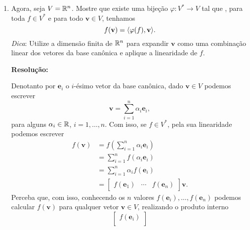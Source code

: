 \documentclass[leqno]{article}
\numberwithin{equation}{section}
\newcommand{\bfv}{\mathbf{v}}
\newcommand{\bfe}{\mathbf{e}}
\newenvironment{sol}
{
    \vspace{4mm}
    \noindent\textbf{Resolução:}
    \strut\newline
    \smallskip
    \hspace{-3.5mm}
}
{}
\begin{document}
\begin{enumerate}
\begin{enumerate}
            \item Agora, seja \( V = \mathbb{R}^{ n } \).
                Mostre que existe uma bijeção \( \varphi : V^{ * } \to V \) tal que , para toda \( f \in V^{ * } \) e para todo \( \bfv \in V \), tenhamos
                \begin{equation*}
                    f(\bfv) = \dotprod{\varphi(f), \bfv}
                .\end{equation*}
                \textit{Dica}: Utilize a dimensão finita de \( \mathbb{R}^{ n } \) para expandir \( \bfv \) como uma combinação linear dos vetores da base canônica e aplique a linearidade de \( f \).

                \begin{sol} 
                    Denotanto por \( \bfe_{ i } \) o \( i \)-ésimo vetor da base canônica, dado \( \bfv \in V \) podemos escrever
                    \begin{equation*}
                        \bfv = \sum_{ i=1 }^{ n } \alpha_{ i } \bfe_{ i }
                    ,\end{equation*}
                    para alguns \( \alpha_{ i } \in \mathbb{R} \), \( i = 1, \dots, n \).
                    Com isso, se \( f \in V^{ * } \), pela sua linearidade podemos escrever
                    \begin{align*}
                        f ( \bfv )
                        &= f \left(
                            \sum_{ i=1 }^{ n } \alpha_{ i } \bfe_{ i }
                        \right) \\
                        &= \sum_{ i=1 }^{ n } f ( \alpha_{ i } \bfe_{ i } ) \\
                        &= \sum_{ i=1 }^{ n } \alpha_{ i } f ( \bfe_{ i } ) \\
                        &=
                        \begin{bmatrix}
                            f ( \bfe_{ 1 } ) & \cdots & f ( \bfe_{ n } )
                        \end{bmatrix}
                        \bfv
                    .\end{align*}
                    Perceba que, com isso, conhecendo os \( n \) valores \( f ( \bfe_{ i } ), \dots, f ( \bfe_{ n } ) \) podemos calcular \( f ( \bfv ) \) para qualquer vetor \( \bfv \in V \), realizando o produto interno
                    \begin{equation*}
                        \begin{bmatrix}
                            f ( \bfe_{ i } ) \\

\end{bmatrix}
\end{equation*}
\end{sol}
\end{enumerate}
\end{enumerate}
\end{document}
